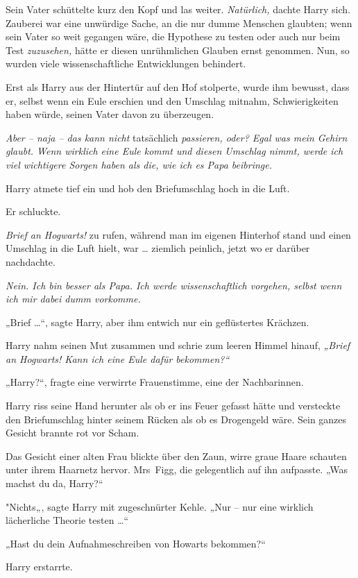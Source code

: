 {Sein Vater schüttelte kurz den Kopf und las weiter. \emph{Natürlich,} dachte Harry sich. Zauberei war eine unwürdige Sache, an die nur dumme Menschen glaubten; wenn sein Vater so weit gegangen wäre, die Hypothese zu testen oder auch nur beim Test \emph{zuzusehen,} hätte er diesen unrühmlichen Glauben ernst genommen. Nun, so wurden viele wissenschaftliche Entwicklungen behindert.

Erst als Harry aus der Hintertür auf den Hof stolperte, wurde ihm bewusst, dass er, selbst wenn ein Eule erschien und den Umschlag mitnahm, Schwierigkeiten haben würde, seinen Vater davon zu überzeugen.

\emph{Aber -- naja -- das kann nicht} tatsächlich \emph{passieren, oder? Egal was mein Gehirn glaubt. Wenn wirklich eine Eule kommt und diesen Umschlag nimmt, werde ich viel wichtigere Sorgen haben als die, wie ich es Papa beibringe.}

Harry atmete tief ein und hob den Briefumschlag hoch in die Luft.

Er schluckte.

\emph{Brief an Hogwarts!} zu rufen, während man im eigenen Hinterhof stand und einen Umschlag in die Luft hielt, war … ziemlich peinlich, jetzt wo er darüber nachdachte.

\emph{Nein. Ich bin besser als Papa. Ich werde wissenschaftlich vorgehen, selbst wenn ich mir dabei dumm vorkomme.}

„Brief …“, sagte Harry, aber ihm entwich nur ein geflüstertes Krächzen.

Harry nahm seinen Mut zusammen und schrie zum leeren Himmel hinauf, \emph{„Brief an Hogwarts! Kann ich eine Eule dafür bekommen?“}

„Harry?“, fragte eine verwirrte Frauenstimme, eine der Nachbarinnen.

Harry riss seine Hand herunter als ob er ins Feuer gefasst hätte und versteckte den Briefumschlag hinter seinem Rücken als ob es Drogengeld wäre. Sein ganzes Gesicht brannte rot vor Scham.

Das Gesicht einer alten Frau blickte über den Zaun, wirre graue Haare schauten unter ihrem Haarnetz hervor. Mrs~Figg, die gelegentlich auf ihn aufpasste. „Was machst du da, Harry?“

"Nichts„, sagte Harry mit zugeschnürter Kehle. „Nur -- nur eine wirklich lächerliche Theorie testen …“

„Hast du dein Aufnahmeschreiben von Howarts bekommen?“

Harry erstarrte.

}
